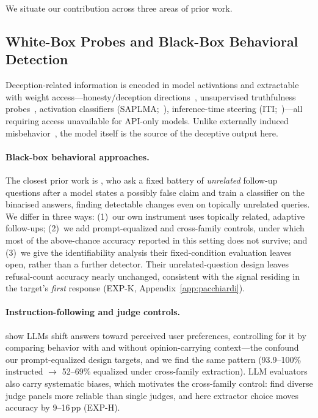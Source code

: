 

We situate our contribution across three areas of prior work.

\subsection{White-Box Probes and Black-Box Behavioral Detection}

Deception-related information is encoded in model activations and extractable with weight access---honesty/deception directions~\citep{zou2023representation}, unsupervised truthfulness probes~\citep{burns2022discovering}, activation classifiers (SAPLMA;~\citealp{azaria2023internal}), inference-time steering (ITI;~\citealp{li2023inference})---all requiring access unavailable for API-only models. Unlike externally induced misbehavior~\citep{goodfellow2014explaining, perez2022ignore}, the model itself is the source of the deceptive output here.

\paragraph{Black-box behavioral approaches.} The closest prior work is \citet{pacchiardi2024catch}, who ask a fixed battery of \emph{unrelated} follow-up questions after a model states a possibly false claim and train a classifier on the binarised answers, finding detectable changes even on topically unrelated queries. We differ in three ways: (1)~our own instrument uses topically related, adaptive follow-ups; (2)~we add prompt-equalized and cross-family controls, under which most of the above-chance accuracy reported in this setting does not survive; and (3)~we give the identifiability analysis their fixed-condition evaluation leaves open, rather than a further detector. Their unrelated-question design leaves refusal-count accuracy nearly unchanged, consistent with the signal residing in the target's \emph{first} response (EXP-K, Appendix~\ref{app:pacchiardi}).

\paragraph{Instruction-following and judge controls.} \citet{sharma2023sycophancy} show LLMs shift answers toward perceived user preferences, controlling for it by comparing behavior with and without opinion-carrying context---the confound our prompt-equalized design targets, and we find the same pattern (93.9--100\% instructed $\to$ 52--69\% equalized under cross-family extraction). LLM evaluators also carry systematic biases, which motivates the cross-family control: \citet{verga2024replacing} find diverse judge panels more reliable than single judges, and here extractor choice moves accuracy by 9--16\,pp (EXP-H).

